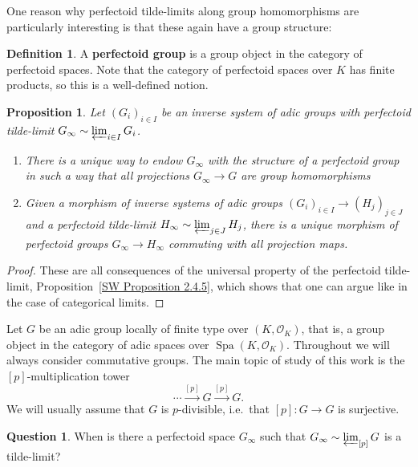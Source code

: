 \documentclass[10pt,oneside]{amsart}
\newtheorem{proposition}[theorem]{Proposition}
\theoremstyle{definition}
\newtheorem{definition}[theorem]{Definition}
\newtheorem{question}[theorem]{Question}
\newcommand{\Spa}{\operatorname{Spa}}
\renewcommand{\O}{\mathcal{O}}
\begin{document}
One reason why perfectoid tilde-limits along group homomorphisms are particularly interesting is that these again have a group structure:

\begin{definition}
	A \textbf{perfectoid group} is a group object in the category of perfectoid spaces.
	Note that the category of perfectoid spaces over $K$ has finite products, so this is a well-defined notion.
\end{definition}

\begin{proposition}\label{perfectoid tilde-limit is perfectoid group in a functorial way}
	Let $(G_i)_{i\in I}$ be an inverse system of adic groups with perfectoid tilde-limit $G_\infty\sim \varprojlim_{i\in I}G_i$.
	\begin{enumerate}
		\item  There is a unique way to endow $G_\infty$ with the structure of a perfectoid group in such a way that all projections $G_\infty\rightarrow G$ are group homomorphisms
		\item Given a morphism of inverse systems of adic groups $(G_i)_{i\in I}\to (H_j)_{j\in J}$ and a perfectoid tilde-limit $H_\infty\sim\varprojlim_{j\in J}H_j$, there is a unique morphism of perfectoid groups $G_\infty\rightarrow H_\infty$
		commuting with all projection maps.
	\end{enumerate}
\end{proposition}
\begin{proof}
	These are all consequences of the universal property of the perfectoid tilde-limit, Proposition~\ref{SW Proposition 2.4.5}, which shows that one can argue like in the case of categorical limits.
\end{proof}

Let $G$ be an adic group locally of finite type over $(K,\O_K)$, that is, a group object in the category of adic spaces over $\Spa(K,\O_K)$. Throughout we will always consider commutative groups. The main topic of study of this work is the $[p]$-multiplication tower
\[ \cdots\xrightarrow{[p]}G\xrightarrow{[p]}G.\]
We will usually assume that $G$ is $p$-divisible, i.e.\ that $[p]\colon G\to G$ is surjective.
\begin{question}\label{qu:tilde-limits-of-adic-groups}
	When is there a perfectoid space $G_\infty$ such that $G_\infty \sim \varprojlim_{[p]} G$ is a tilde-limit?
\end{question}
\end{document}
